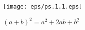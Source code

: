 \documentclass[main.tex]{subfiles}
\begin{document}
\begin{figure}[h]
	\centering
	\texttt{[image: eps/ps.1.1.eps]}
	\caption{$(a+b)^2 = a^2 + 2ab + b^2$}
	\label{fig:chap1.5.1}
\end{figure}	
\end{document}
